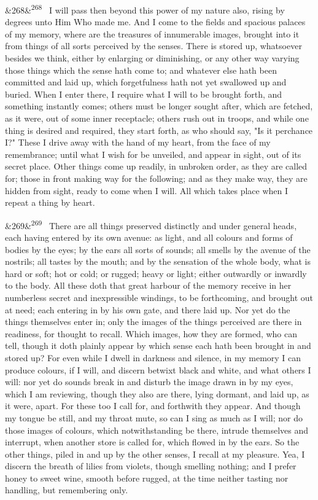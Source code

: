 \documentclass[12pt]{article}
\newcommand{\para}[1][]{\par\noindent\ifx&#1&\else\textsuperscript{\footnotesize #1}~\fi}
\begin{document}
\para[268] I will pass then beyond this power of my nature also, rising by degrees unto Him Who made me. And I come to the fields and spacious palaces of my memory, where are the treasures of innumerable images, brought into it from things of all sorts perceived by the senses. There is stored up, whatsoever besides we think, either by enlarging or diminishing, or any other way varying those things which the sense hath come to; and whatever else hath been committed and laid up, which forgetfulness hath not yet swallowed up and buried. When I enter there, I require what I will to be brought forth, and something instantly comes; others must be longer sought after, which are fetched, as it were, out of some inner receptacle; others rush out in troops, and while one thing is desired and required, they start forth, as who should say, "Is it perchance I?" These I drive away with the hand of my heart, from the face of my remembrance; until what I wish for be unveiled, and appear in sight, out of its secret place. Other things come up readily, in unbroken order, as they are called for; those in front making way for the following; and as they make way, they are hidden from sight, ready to come when I will. All which takes place when I repeat a thing by heart.

\para[269] There are all things preserved distinctly and under general heads, each having entered by its own avenue: as light, and all colours and forms of bodies by the eyes; by the ears all sorts of sounds; all smells by the avenue of the nostrils; all tastes by the mouth; and by the sensation of the whole body, what is hard or soft; hot or cold; or rugged; heavy or light; either outwardly or inwardly to the body. All these doth that great harbour of the memory receive in her numberless secret and inexpressible windings, to be forthcoming, and brought out at need; each entering in by his own gate, and there laid up. Nor yet do the things themselves enter in; only the images of the things perceived are there in readiness, for thought to recall. Which images, how they are formed, who can tell, though it doth plainly appear by which sense each hath been brought in and stored up? For even while I dwell in darkness and silence, in my memory I can produce colours, if I will, and discern betwixt black and white, and what others I will: nor yet do sounds break in and disturb the image drawn in by my eyes, which I am reviewing, though they also are there, lying dormant, and laid up, as it were, apart. For these too I call for, and forthwith they appear. And though my tongue be still, and my throat mute, so can I sing as much as I will; nor do those images of colours, which notwithstanding be there, intrude themselves and interrupt, when another store is called for, which flowed in by the ears. So the other things, piled in and up by the other senses, I recall at my pleasure. Yea, I discern the breath of lilies from violets, though smelling nothing; and I prefer honey to sweet wine, smooth before rugged, at the time neither tasting nor handling, but remembering only.
\end{document}
